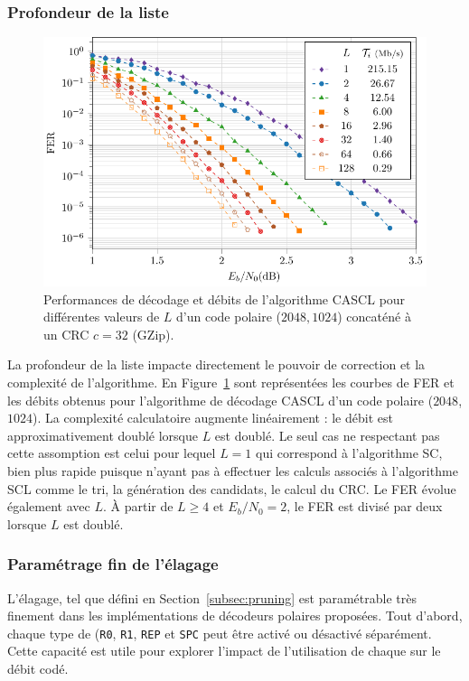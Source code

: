 \subsubsection{Profondeur de la liste}
\begin{figure}[t]
\includegraphics[width=\textwidth]{main/ch2_fig/curves/L/tikz/L}
\caption{Performances de décodage et débits de l'algorithme CASCL pour différentes valeurs de $L$ d'un code polaire ($2048,1024$) concaténé à un CRC $c=32$ (GZip).}
\label{fig:scl_l_thr}
\end{figure}
La profondeur de la liste impacte directement le pouvoir de correction et la complexité de l'algorithme. En Figure~\ref{fig:scl_l_thr} sont représentées les courbes de FER et les débits obtenus pour l'algorithme de décodage CASCL d'un code polaire ($2048$,$1024$). La complexité calculatoire augmente linéairement : le débit est approximativement doublé lorsque $L$ est doublé. Le seul cas ne respectant pas cette assomption est celui pour lequel $L=1$ qui correspond à l'algorithme SC, bien plus rapide puisque n'ayant pas à effectuer les calculs associés à l'algorithme SCL comme le tri, la génération des candidats, le calcul du CRC. Le FER évolue également avec $L$. \`A partir de $L\geq4$ et $E_b/N_0=2$, le FER est divisé par deux lorsque $L$ est doublé.

\subsubsection{Paramétrage fin de l'élagage}
L'élagage, tel que défini en Section~\ref{subsec:pruning} est paramétrable très finement dans les implémentations de décodeurs polaires proposées. Tout d'abord, chaque type de \noeud (\texttt{R0}, \texttt{R1}, \texttt{REP} et \texttt{SPC} peut être activé ou désactivé séparément. Cette capacité est utile pour explorer l'impact de l'utilisation de chaque \noeud sur le débit codé.

